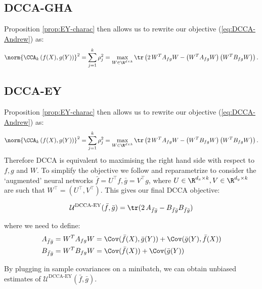 \subsection{DCCA-GHA}

Proposition \ref{prop:EY-charac} then allows us to rewrite our objective (\ref{eq:DCCA-Andrew}) as:
\begin{align*}
    \norm{\CCA_k\left(f(X),g(Y)\right)}^2 
    = \sum_{j=1}^k \rho_j^2 
    = \max_{W \in \R^{d \times k}} \tr \left( 2\, W^T A_{fg} W - \left(W^T A_{fg} W\right) \left(W^T B_{fg} W\right) \right).
\end{align*}

\subsection{DCCA-EY}

Proposition \ref{prop:EY-charac} then allows us to rewrite our objective (\ref{eq:DCCA-Andrew}) as:
\begin{align*}
    \norm{\CCA_k\left(f(X),g(Y)\right)}^2 
    = \sum_{j=1}^k \rho_j^2 
    = \max_{W \in \R^{d \times k}} \tr \left( 2\, W^T A_{fg} W - \left(W^T B_{fg} W\right) \left(W^T B_{fg} W\right) \right).
\end{align*}
Therefore DCCA is equivalent to maximising the right hand side with respect to $f,g$ and $W$. To simplify the objective we follow \cite{wang2015stochastic} and reparametrize to consider the `augmented' neural networks $\bar{f} = U^{\top} f, \bar{g} = V^{\top} g$, where $U\in \R^{d_x \times k}, V\in \R^{d_y \times k}$ are such that $W^{\top} = (U^{\top}, V^{\top})$. This gives our final DCCA objective:

\begin{align}\label{eq:DCCA-EY}
    \mathcal{U}^\text{DCCA-EY}(\bar{f},\bar{g}) = \tr(2 \, A_{\bar{f}\bar{g}} - B_{\bar{f}\bar{g}} B_{\bar{f}\bar{g}})
\end{align}

where we need to define:
\begin{align*}
    A_{\bar{f}\bar{g}}
    &= W^T A_{fg} W 
    = \Cov(\bar{f}(X),\bar{g}(Y)) + \Cov(\bar{g}(Y),\bar{f}(X)) \\
    B_{\bar{f}\bar{g}} 
    &= W^T B_{fg} W 
    = \Cov(\bar{f}(X)) + \Cov(\bar{g}(Y))
\end{align*}


By plugging in sample covariances on a minibatch, we can obtain unbiased estimates of $\mathcal{U}^\text{DCCA-EY}(\bar{f},\bar{g})$.

